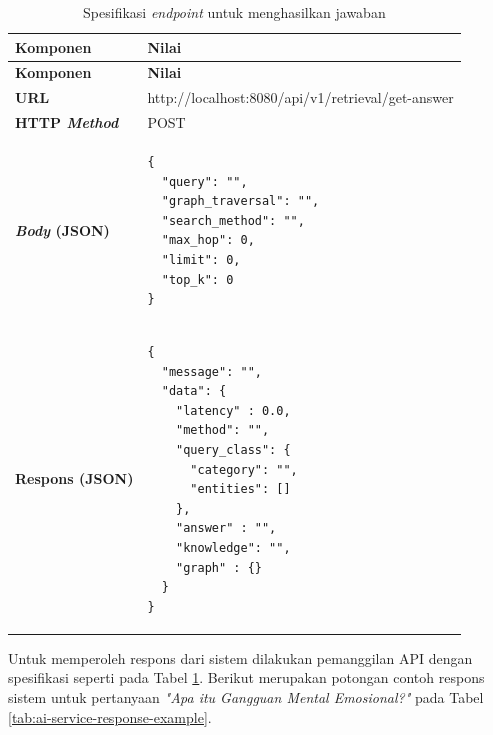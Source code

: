 \begin{longtable}{|p{}|p{}|}
	\caption{Spesifikasi \textit{endpoint} untuk menghasilkan jawaban}
	\label{tab:ai-service-answer}                                                               \\
	\hline
	\textbf{Komponen}             & \textbf{Nilai}                                              \\
	\hline \hline
	\endfirsthead

	\hline
	\textbf{Komponen}             & \textbf{Nilai}                                              \\
	\hline \hline
	\endhead


	\textbf{URL}                  &
	http://localhost:8080/api/v1/retrieval/get-answer                                           \\
	\hline
	\textbf{HTTP \textit{Method}} &
	POST                                                                                        \\
	\hline
	\textbf{\textit{Body} (JSON)} & \begin{lstlisting}[basicstyle=\ttfamily\small, numbers=none]
{
  "query": "",
  "graph_traversal": "",
  "search_method": "",
  "max_hop": 0,
  "limit": 0,
  "top_k": 0
}
    \end{lstlisting} \\
	\hline
	\textbf{Respons (JSON)}       & \begin{lstlisting}[basicstyle=\ttfamily\small, numbers=none]
{
  "message": "",
  "data": {
    "latency" : 0.0,
    "method": "",
    "query_class": {
      "category": "",
      "entities": []
    },
    "answer" : "",
    "knowledge": "",
    "graph" : {}
  }
}
    \end{lstlisting} \\
	\hline
\end{longtable}

Untuk memperoleh respons dari sistem dilakukan pemanggilan API dengan spesifikasi seperti pada Tabel \ref{tab:ai-service-answer}.
Berikut merupakan potongan contoh respons sistem untuk pertanyaan \textit{"Apa itu Gangguan Mental Emosional?"} pada Tabel \ref{tab:ai-service-response-example}.

